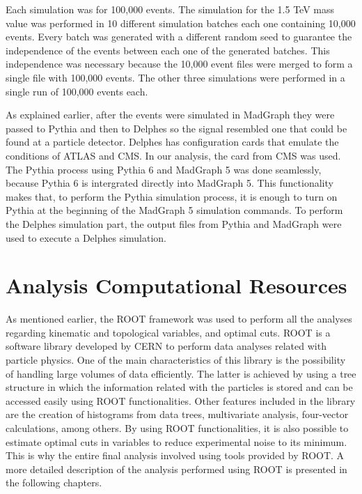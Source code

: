 Each simulation was for 100,000 events. The simulation for the 1.5 TeV mass value was performed in 10 different simulation batches each one containing 10,000 events. Every batch was generated with a different random seed to guarantee the independence of the events between each one of the generated batches. This independence was necessary because the 10,000 event files were merged to form a single file with 100,000 events. The other three simulations were performed in a single run of 100,000 events each.

As explained earlier, after the events were simulated in MadGraph they were passed to Pythia and then to Delphes so the signal resembled one that could be found at a particle detector. Delphes has configuration cards that emulate the conditions of ATLAS and CMS. In our analysis, the card from CMS was used. The Pythia process using Pythia 6 and MadGraph 5 was done seamlessly, because Pythia 6 is intergrated directly into MadGraph 5. This functionality makes that, to perform the Pythia simulation process, it is enough to turn on Pythia at the beginning of the MadGraph 5 simulation commands. To perform the Delphes simulation part, the output files from Pythia and MadGraph were used to execute a Delphes simulation.

\section{Analysis Computational Resources}

As mentioned earlier, the ROOT framework was used to perform all the analyses regarding kinematic and topological variables, and optimal cuts. ROOT is a software library developed by CERN to perform data analyses related with particle physics. One of the main characteristics of this library is the possibility of handling large volumes of data efficiently. The latter is achieved by using a tree structure in which the information related with the particles is stored and can be accessed easily using ROOT functionalities. Other features included in the library are the creation of histograms from data trees, multivariate analysis, four-vector calculations, among others. By using ROOT functionalities, it is also possible to estimate optimal cuts in variables to reduce experimental noise to its minimum. This is why the entire final analysis involved using tools provided by ROOT. A more detailed description of the analysis performed using ROOT is presented in the following chapters.

